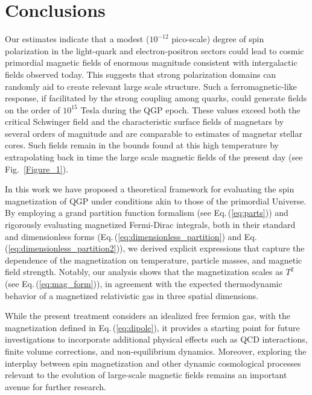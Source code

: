 \documentclass[epjST]{svjour}
\newcommand{\req}[1]{Eq.\,(\ref{#1})}
\begin{document}
\section{Conclusions}
\label{sec:conclusions}
Our estimates indicate that a modest (\(10^{-12}\) pico-scale) degree of spin polarization in the light-quark and electron-positron sectors could lead to cosmic primordial magnetic fields of enormous magnitude consistent with intergalactic fields observed today. This suggests that strong polarization domains can randomly aid to create relevant large scale structure. Such a ferromagnetic-like response, if facilitated by the strong coupling among quarks, could generate fields on the order of \(10^{15}\) Tesla during the QGP epoch. These values exceed both the critical Schwinger field and the characteristic surface fields of magnetars by several orders of magnitude and are comparable to estimates of magnetar stellar cores. Such fields remain in the bounds found at this high temperature by extrapolating back in time the large scale magnetic fields of the present day (see Fig.~\ref{Figure_1}).

In this work we have proposed a theoretical framework for evaluating the spin magnetization of QGP under conditions akin to those of the primordial Universe. By employing a grand partition function formalism (see \req{eq:parts}) and rigorously evaluating magnetized Fermi-Dirac integrals, both in their standard and dimensionless forms (\req{eq:dimensionless_partition} and \req{eq:dimensionless_partition2}), we derived explicit expressions that capture the dependence of the magnetization on temperature, particle masses, and magnetic field strength. Notably, our analysis shows that the magnetization scales as \(T^2\) (see \req{eq:mag_form}), in agreement with the expected thermodynamic behavior of a magnetized relativistic gas in three spatial dimensions.

While the present treatment considers an idealized free fermion gas, with the magnetization defined in \req{eq:dipole}, it provides a starting point for future investigations to incorporate additional physical effects such as QCD interactions, finite volume corrections, and non-equilibrium dynamics. Moreover, exploring the interplay between spin magnetization and other dynamic cosmological processes relevant to the evolution of large-scale magnetic fields remains an important avenue for further research.\\
\end{document}
